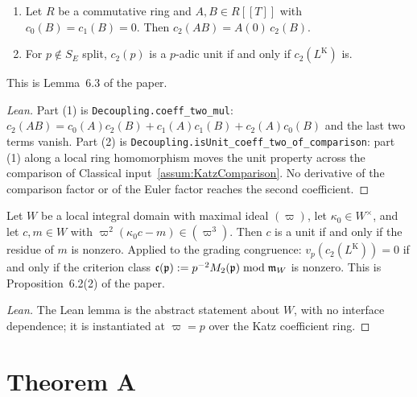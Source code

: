 \begin{lemma}[Decoupling]
  \label{lem:Decoupling}
  \leanok
  \begin{enumerate}
    \item Let $R$ be a commutative ring and $A, B \in R[[T]]$ with
      $c_0(B) = c_1(B) = 0$. Then $c_2(AB) = A(0)\, c_2(B)$.
    \item For $p \notin S_E$ split, $c_2(p)$ is a $p$-adic unit if and only
      if $c_2(L^{\mathrm{K}})$ is.
  \end{enumerate}
  This is Lemma~6.3 of the paper.
\end{lemma}
\begin{proof}[Lean]
  \leanok
  Part (1) is \texttt{Decoupling.coeff\_two\_mul}: $c_2(AB) = c_0(A)c_2(B) +
  c_1(A)c_1(B) + c_2(A)c_0(B)$ and the last two terms vanish. Part (2) is
  \texttt{Decoupling.isUnit\_coeff\_two\_of\_comparison}: part (1) along a
  local ring homomorphism moves the unit property across the comparison of
  Classical input~\ref{assum:KatzComparison}. No derivative of the
  comparison factor or of the Euler factor reaches the second coefficient.
\end{proof}

\begin{proposition}
  \label{prop:CriterionClass}
  \leanok
  Let $W$ be a local integral domain with maximal ideal $(\varpi)$, let
  $\kappa_0 \in W^\times$, and let $c, m \in W$ with
  $\varpi^2(\kappa_0 c - m) \in (\varpi^3)$. Then $c$ is a unit if and only
  if the residue of $m$ is nonzero. Applied to the grading congruence:
  $v_p(c_2(L^{\mathrm{K}})) = 0$ if and only if the criterion class
  $\mathfrak{c}({\mathfrak{p}}) := p^{-2}M_2({\mathfrak{p}}) \bmod \mathfrak{m}_W$ is nonzero.
  This is Proposition~6.2(2) of the paper.
\end{proposition}
\begin{proof}[Lean]
  \leanok
  The Lean lemma is the abstract statement about $W$, with no interface
  dependence; it is instantiated at $\varpi = p$ over the Katz coefficient
  ring.
\end{proof}

\chapter{Theorem A}
\label{ch:theoremA}

